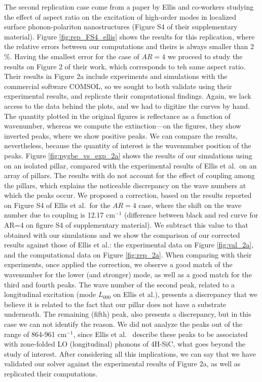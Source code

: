 The second replication case come from a paper by Ellis and co-workers \cite{ellis2016} studying the effect of aspect ratio on the excitation of high-order modes in localized surface phonon-polariton nanostructures (Figure S4 of their supplementary material).
Figure \ref{fig:rep_FS4_ellis} shows the results for this replication, where the relative errors between our computations and theirs is always smaller than 2$\%$. Having the smallest error for the case of $AR=4$ we proceed to study the results on Figure 2 of their work, which corresponds to teh same aspect ratio.
Their results in Figure 2a include experiments and simulations with the commercial software COMSOL, so we sought to both validate \pygbe using their experimental results, and replicate their computational findings. 
Again, we lack access to the data behind the plots, and we had to digitize the curves by hand. 
The quantity plotted in the original figures is reflectance as a function of wavenumber, whereas we compute the extinction---on the figures, they show inverted peaks, where we show positive peaks.
We can compare the results, nevertheless, because the quantity of interest is the wavenumber position of the peaks.
Figure \ref{fig:pygbe_vs_exp_2a} shows the results of our simulations using \pygbe on an isolated pillar,
compared with the experimental results of Ellis et al.\ on an array of pillars.
The results with \pygbe  do not account for the effect of coupling among the pillars, which explains the noticeable discrepancy on the wave numbers at which the peaks occur. 
We proposed a correction, based on the results reported on Figure S4 of Ellis et al.\ for the $AR=4$ case, where the shift on the wave number due to coupling is 12.17 cm$^{-1}$ (difference between black and red curve for AR=4 on figure S4 of supplementary material). 
We subtract this value to that obtained with our simulations and we show the comparison of our corrected results against those of Ellis et al.: the experimental data on Figure \ref{fig:val_2a}, and the
computational data on Figure \ref{fig:rep_2a}. 
When comparing with their experiments, once applied the correction, we observe a good match of the wavenumber for the lower (and stronger) mode, as well as a good match for the 
third and fourth peaks. The wave number of the second peak, related to a longitudinal excitation (mode $L_{000}$ on Ellis et al.), presents a discrepancy that we believe it is related to the fact that our 
pillar does not have a substrate underneath. The remaining (fifth) peak, also presents a discrepancy, but in this case we can not identify the reason.
We did not analyze the peaks out of the range of 864-961 cm$^{-1}$, since Ellis et al. \ describe these peaks to be associated with zone-folded LO (longitudinal) phonons of 4H-SiC,
what goes beyond the study of interest.
After considering all this implications, we can say that we have validated our solver \pygbe against the experimental results of Figure 2a, as well as replicated their computations. 

